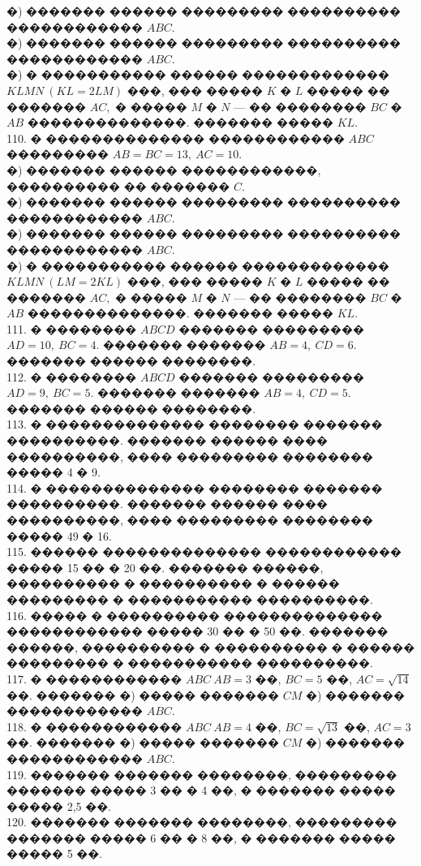 \documentclass[12pt]{article}
\begin{document}
�) ������� ������ ��������� ���������� ������������ $ABC.$\\
�) ������� ������ ��������� ���������� ������������ $ABC.$\\
�) � ����������� ������ ������������� $KLMN\ (KL=2LM)$ ���, ��� ����� $K$ � $L$ ����� �� ������� $AC,$ � ����� $M$ � $N$ --- �� �������� $BC$ � $AB$ ��������������. ������� ����� $KL.$\\
110. � �������������� ������������ $ABC$ ��������� $AB=BC=13,\ AC=10.$\\
�) ������� ������ ������������, ���������� �� ������� $C.$\\
�) ������� ������ ��������� ���������� ������������ $ABC.$\\
�) ������� ������ ��������� ���������� ������������ $ABC.$\\
�) � ����������� ������ ������������� $KLMN\ (LM=2KL)$ ���, ��� ����� $K$ � $L$ ����� �� ������� $AC,$ � ����� $M$ � $N$ --- �� �������� $BC$ � $AB$ ��������������. ������� ����� $KL.$\\
111. � �������� $ABCD$ ������� ��������� $AD=10,\ BC=4.$ ������� ������� $AB=4,\ CD=6.$ ������� ������ ��������.\\
112. � �������� $ABCD$ ������� ��������� $AD=9,\ BC=5.$ ������� ������� $AB=4,\ CD=5.$ ������� ������ ��������.\\
113. � �������������� �������� ������� ����������. ������� ������ ���� ����������, ���� ��������� �������� ����� 4 � 9.\\
114. � �������������� �������� ������� ����������. ������� ������ ���� ����������, ���� ��������� �������� ����� 49 � 16.\\
115. ������ �������������� ������������ ����� 15 �� � 20 ��. ������� ������, ���������� � ���������� � ������ ��������� � ����������� ����������.\\
116. ����� � ���������� �������������� ������������ ����� 30 �� � 50 ��. ������� ������, ���������� � ���������� � ������ ��������� � ����������� ����������.\\
117. � ������������ $ABC\ AB=3$ ��, $BC=5$ ��, $AC=\sqrt{14}$ ��. ������� �) ����� ������� $CM$ �) ������� ������������ $ABC.$\\
118. � ������������ $ABC\ AB=4$ ��, $BC=\sqrt{13}$ ��, $AC=3$ ��. ������� �) ����� ������� $CM$ �) ������� ������������ $ABC.$\\
119. ������� ������� ��������, ��������� ������� ����� 3 �� � 4 ��, � ������� ����� ����� 2,5 ��.\\
120. ������� ������� ��������, ��������� ������� ����� 6 �� � 8 ��, � ������� ����� ����� 5 ��.\\
\end{document}
